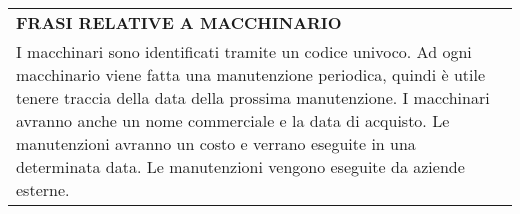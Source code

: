 \begin{center}
	\vspace{0.5cm}
	
	\begin{tabular}{P{16cm}}
		\toprule
		 \textbf {\large {FRASI RELATIVE A MACCHINARIO}} \\
		I macchinari sono identificati tramite un codice univoco. Ad ogni macchinario viene fatta una manutenzione periodica, quindi è utile tenere traccia della data della prossima manutenzione. I macchinari avranno anche un nome commerciale e la data di acquisto. Le manutenzioni avranno un costo e verrano eseguite in una determinata data. Le manutenzioni vengono eseguite da aziende esterne.\\
		\bottomrule
	\end{tabular}
	
\end{center}